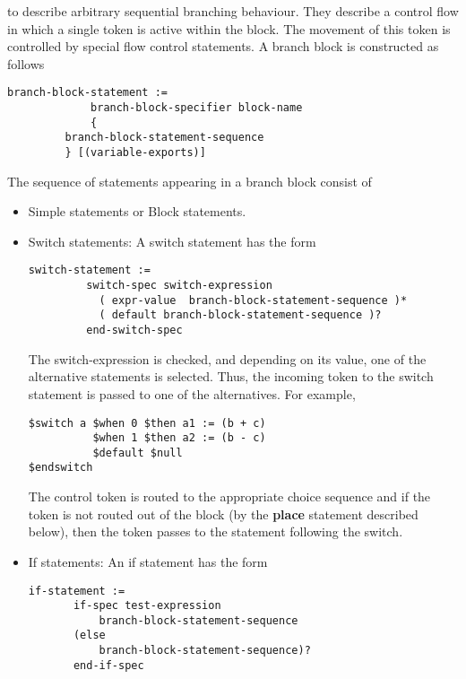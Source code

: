 \documentclass{article}
\begin{document}
\begin{itemize}
to describe arbitrary sequential branching behaviour.  They 
describe a control flow in which a single token 
is active within the block.  The movement of this token is
controlled by special flow control statements.
A branch block is constructed 
as follows
\begin{verbatim}
branch-block-statement :=
             branch-block-specifier block-name
             { 
		 branch-block-statement-sequence 
	     } [(variable-exports)]
\end{verbatim}
The sequence of statements appearing in a branch block
consist of
\begin{itemize}
\item Simple statements or Block statements.
\item Switch statements: A switch statement has
the form
\begin{verbatim}
switch-statement :=
         switch-spec switch-expression
           ( expr-value  branch-block-statement-sequence )*
           ( default branch-block-statement-sequence )?
         end-switch-spec
\end{verbatim}
The switch-expression is checked, and depending on its
value, one of the alternative statements is selected.
Thus, the incoming token to the switch statement is 
passed to one of the alternatives.  For example,
\begin{verbatim}
$switch a $when 0 $then a1 := (b + c)
          $when 1 $then a2 := (b - c)
          $default $null
$endswitch
\end{verbatim}
The control token is routed to the appropriate
choice sequence and if the token is not routed out 
of the block (by the {\bf place} statement 
described below), then the token passes to the
statement following the switch. 
\item If statements: An if statement has the form
\begin{verbatim}
if-statement :=
       if-spec test-expression 
           branch-block-statement-sequence
       (else
           branch-block-statement-sequence)?
       end-if-spec
       

\end{verbatim}
\end{itemize}
\end{itemize}
\end{document}
